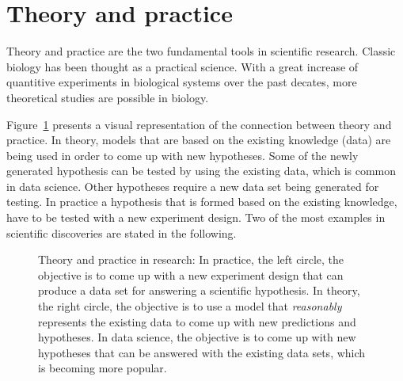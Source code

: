\section{Theory and practice}
\label{sec:theoryandpractice}

Theory and practice are the two fundamental tools in scientific research. 
Classic biology has been thought as a practical science.
With a great increase of quantitive experiments in biological systems over the past decates, more theoretical studies are possible in biology.

Figure~\ref{fig:1} presents a visual representation of the connection between theory and practice.
In theory, models that are based on the existing knowledge (data) are being used in order to come up with new hypotheses. 
Some of the newly generated hypothesis can be tested by using the existing data, which is common in data science.
Other hypotheses require a new data set being generated for testing.
In practice a hypothesis that is formed based on the existing knowledge, have to be tested with a new experiment design.
Two of the most examples in scientific discoveries are stated in the following.

\begin{figure}
	\centering 
	 \caption[Theory and practice]{Theory and practice in research: In practice, the left circle, the objective is to come up with a new experiment design that can produce a data set for answering a scientific hypothesis. In theory, the right circle, the objective is to use a model that \textit{reasonably} represents the existing data to come up with new predictions and hypotheses. In data science, the objective is to come up with new hypotheses that can be answered with the existing data sets, which is becoming more popular.}
	 \label{fig:1}
\end{figure}

